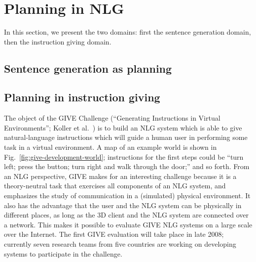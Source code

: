 \section{Planning in NLG} \label{sec:domains}

In this section, we present the two domains: first the sentence
generation domain, then the instruction giving domain.


\subsection{Sentence generation as planning}






\subsection{Planning in instruction giving}

The object of the GIVE Challenge (``Generating Instructions in Virtual
Environments''; Koller et al.\
\citeyear{alexander07:_shared_task_propos}) is to build an NLG system
which is able to give natural-language instructions which will guide a
human user in performing some task in a virtual environment.  A map of
an example world is shown in Fig.~\ref{fig:give-development-world};
instructions for the first steps could be ``turn left; press the
button; turn right and walk through the door;'' and so forth.  From an
NLG perspective, GIVE makes for an interesting challenge because it is
a theory-neutral task that exercises all components of an NLG system,
and emphasizes the study of communication in a (simulated) physical
environment.  It also has the advantage that the user and the NLG
system can be physically in different places, as long as the 3D client
and the NLG system are connected over a network.  This makes it
possible to evaluate GIVE NLG systems on a large scale over the
Internet.  The first GIVE evaluation will take place in late 2008;
currently seven research teams from five countries are working on
developing systems to participate in the challenge.


